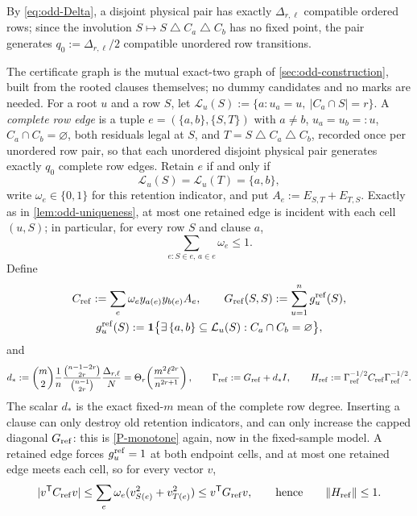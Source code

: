 \documentclass[11pt]{article}
\theoremstyle{definition}
\theoremstyle{remark}
\newcommand{\1}{\mathbf 1}
\newcommand{\cL}{\mathcal L}
\newcommand{\sd}{\mathbin{\triangle}}
\numberwithin{equation}{section}
\begin{document}
By \cref{eq:odd-Delta}, a disjoint physical pair has exactly
$\Delta_{r,\ell}$ compatible ordered rows; since the involution
$S\mapsto S\sd C_a\sd C_b$ has no fixed point, the pair generates
$q_0:=\Delta_{r,\ell}/2$ compatible unordered row transitions.

The certificate graph is the mutual exact-two graph of
\cref{sec:odd-construction}, built from the rooted clauses themselves;
no dummy candidates and no marks are needed.  For a root $u$ and a row
$S$, let $\cL_u(S):=\{a:u_a=u,\ |C_a\cap S|=r\}$.  A \emph{complete row
edge} is a tuple $e=(\{a,b\},\{S,T\})$ with $a\ne b$, $u_a=u_b=:u$,
$C_a\cap C_b=\varnothing$, both residuals legal at $S$, and
$T=S\sd C_a\sd C_b$, recorded once per unordered row pair, so that each
unordered disjoint physical pair generates exactly $q_0$ complete row
edges.  Retain $e$ if and only if
\begin{equation}\label{eq:hard-isolation}
 \cL_u(S)=\cL_u(T)=\{a,b\},
\end{equation}
write $\omega_e\in\{0,1\}$ for this retention indicator, and put
$A_e:=E_{S,T}+E_{T,S}$.  Exactly as in \cref{lem:odd-uniqueness}, at
most one retained edge is incident with each cell $(u,S)$; in
particular, for every row $S$ and clause $a$,
\begin{equation}\label{eq:hard-port-capacity}
 \sum_{e:S\in e,\,a\in e}\omega_e\le1.
\end{equation}
Define
\begin{equation}\label{eq:odd-hard-ops}
\begin{gathered}
 C_{\rm ref}:=\sum_e\omega_ey_{a(e)}y_{b(e)}A_e,
 \qquad
 G_{\rm ref}(S,S):=\sum_{u=1}^ng^{\rm ref}_u(S),\\
 g^{\rm ref}_u(S):=\1\bigl\{\exists\,\{a,b\}\subseteq\cL_u(S):
 C_a\cap C_b=\varnothing\bigr\},
\end{gathered}
\end{equation}
and
\begin{equation}\label{eq:odd-dstar}
 d_*:=\binom m2\frac1n
 \frac{\binom{n-1-2r}{2r}}{\binom{n-1}{2r}}
 \frac{\Delta_{r,\ell}}N
 =\Theta_r\!\left(\frac{m^2\ell^{2r}}{n^{2r+1}}\right),
 \qquad
 \Gamma_{\rm ref}:=G_{\rm ref}+d_*I,
 \qquad
 H_{\rm ref}:=\Gamma_{\rm ref}^{-1/2}C_{\rm ref}\Gamma_{\rm ref}^{-1/2}.
\end{equation}
The scalar $d_*$ is the exact fixed-$m$ mean of the complete row
degree.  Inserting a clause can only destroy old retention indicators,
and can only increase the capped diagonal $G_{\rm ref}$: this is
\ref{P-monotone} again, now in the fixed-sample model.  A retained edge
forces $g^{\rm ref}_u=1$ at both endpoint cells, and at most one
retained edge meets each cell, so for every vector $v$,
\begin{equation}\label{eq:odd-hard-contraction}
 |v^{\mathsf T}C_{\rm ref}v|
 \le\sum_e\omega_e(v_{S(e)}^2+v_{T(e)}^2)
 \le v^{\mathsf T}G_{\rm ref}v,
 \qquad\text{hence}\qquad \|H_{\rm ref}\|\le1.
\end{equation}
\end{document}
